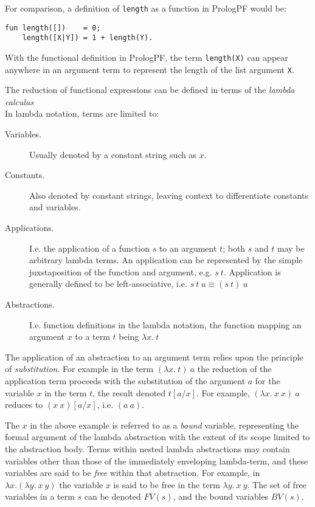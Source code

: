 For comparison, a definition of \texttt{length} as a function in PrologPF
would be:
\begin{verbatim}
fun length([])    = 0;
    length([X|Y]) = 1 + length(Y).
\end{verbatim}

With the functional definition in PrologPF, the term \texttt{length(X)} can appear
anywhere in an argument term to represent the length of the list argument
\texttt{X}.

The reduction of functional expressions can be defined in terms of the
\textit{lambda calculus}\\
In lambda notation, terms are limited to:
\begin{description}
\item[Variables.]{Usually denoted by a constant string such as $x$.}
\item[Constants.]{Also denoted by constant strings, leaving context to
  differentiate constants and variables.}
\item[Applications.]{I.e. the application of a function $s$ to an
  argument $t$; both $s$ and $t$ may be arbitrary lambda terms.  An application
  can be represented by the simple juxstaposition of the function and argument,
  e.g. $s\ t$.  Application is generally defined to be left-associative, i.e.
  $s\ t\ u \equiv (s\ t)\ u$}
\item[Abstractions.]{I.e. function definitions in the lambda notation, the function
  mapping an argument $x$ to a term $t$ being $\lambda x.\ t$}
\end{description}

The application of an abstraction to an argument term relies upon the
principle of \textit{substitution}.  For example in the term
$(\lambda x.\ t)\ a$ the reduction of the application term proceeds with
the substitution of the argument $a$ for the variable $x$ in the term $t$, the
result denoted $t[a/x]$.  For example, $(\lambda x.\ x\ x)\ a$ reduces to
$(x\ x)[a/x]$, i.e. $(a\ a)$.

The $x$ in the above example is referred to as a \textit{bound} variable, representing
the formal argument of the lambda abstraction with the extent of its scope limited to
the abstraction body.  Terms within nested lambda abstractions may contain variables
other than those of the immediately enveloping lambda-term, and these variables are
said to be \textit{free} within that abstraction.  For example, in
$\lambda x.( \lambda y.\ x\ y)$ the variable $x$ is said to be free in the term
$\lambda y.\ x\ y$.  The set of free variables in a term $s$ can be denoted $FV(s)$, and 
the bound variables $BV(s)$.


